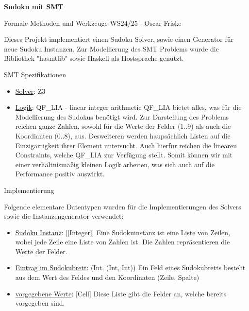 

\usepackage{listings}



\begin{Large}
    \textsf{\textbf{Sudoku mit SMT}}

    Formale Methoden und Werkzeuge WS24/25 - Oscar Friske
\end{Large}
\vspace{2ex}

Dieses Projekt implementiert einen Sudoku Solver, sowie einen Generator für neue Sudoku Instanzen. Zur Modellierung des SMT Problems wurde die Bibliothek "hasmtlib" sowie Haskell als Hostsprache genutzt.

\vspace{2ex}

\begin{Large}
    SMT Spezifikationen
\end{Large}
\begin{itemize}
  \item \underline{Solver}: Z3
  \item \underline{Logik}: QF\_LIA - linear integer arithmetic \newline
        QF\_LIA bietet alles, was für die Modellierung des Sudokus benötigt wird. Zur Darstellung des Problems reichen ganze Zahlen, sowohl für die Werte der Felder (1..9) als auch die Koordianten (0..8), aus. Desweiteren werden haupsächlich Listen auf die Einzigartigkeit ihrer Element untersucht. Auch hierfür reichen die linearen Constraints, welche QF\_LIA zur Verfügung stellt. Somit können wir mit einer verhältnismäßig kleinen Logik arbeiten, was sich auch auf die Performance positiv auswirkt.
\end{itemize}
\vspace{2ex}

\begin{Large}
    Implementierung
\end{Large}
\vspace{2ex}

Folgende elementare Datentypen wurden für die Implementierungen des Solvers sowie die Instanzengenerator verwendet:
\begin{itemize}
    \item \underline{Sudoku Instanz}: [[Integer]] \newline
    Eine Sudokuinstanz ist eine Liste von Zeilen, wobei jede Zeile eine Liste von Zahlen ist. Die Zahlen repräsentieren die Werte der Felder.
    \item \underline{Eintrag im Sudokubrett}: (Int, (Int, Int)) \newline
    Ein Feld eines Sudokubretts besteht aus dem Wert des Feldes und den Koordinaten (Zeile, Spalte)
    \item \underline{vorgegebene Werte}: [Cell] \newline
    Diese Liste gibt die Felder an, welche bereits vorgegeben sind.
\end{itemize}

